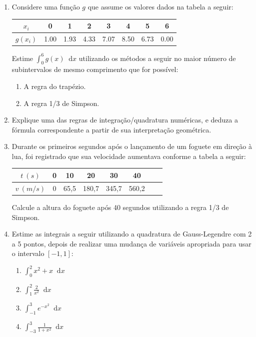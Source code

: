 \documentclass[12pt,a4paper]{article}
\newcommand*\diff{\mathop{}\!\mathrm{d}}
\begin{document}
\begin{enumerate}
\item Considere uma função $g$ que assume os valores dados na tabela a seguir:
\begin{center}
\begin{tabular}{|c|c|c|c|c|c|c|c|}
\hline
   $x_i$ & 0 & 1 & 2 & 3 & 4 & 5 & 6 \\ \hline
$g(x_i)$ & 1.00 & 1.93 & 4.33 & 7.07 & 8.50 & 6.73 & 0.00 \\
\hline
\end{tabular}
\end{center}
Estime $\int_0^6 g(x)\diff{x}$ utilizando os métodos a seguir no maior número de subintervalos de mesmo comprimento que for possível:
\begin{multicols}{2}
\begin{enumerate}
\item A regra do trapézio.
\item A regra 1/3 de Simpson.
\end{enumerate}
\end{multicols}

\item Explique uma das regras de integração/quadratura numéricas, e deduza a fórmula correspondente a partir de sua interpretação geométrica.

\item Durante os primeiros segundos após o lançamento de um foguete em direção à lua, foi registrado que sua velocidade aumentava conforme a tabela a seguir:
\begin{center}
\begin{tabular}{|c|c|c|c|c|c|c|c|}
\hline
  $t\ (s)$ & 0 & 10 & 20 & 30 & 40 \\ \hline
$v\ (m/s)$ & 0 & 65,5 & 180,7 & 345,7 & 560,2 \\
\hline
\end{tabular}
\end{center}
Calcule a altura do foguete após 40 segundos utilizando a regra 1/3 de Simpson.

\item Estime as integrais a seguir utilizando a quadratura de Gauss-Legendre com 2 a 5 pontos, depois de realizar uma mudança de variáveis apropriada para usar o intervalo $[-1,1]$:
\begin{multicols}{4}
\begin{enumerate}
\item $\int_0^2 x^2 + x\diff{x}$
\item $\int_1^2 \frac{2}{x^2}\diff{x}$
\item $\int_{-1}^3 e^{-x^2}\diff{x}$
\item $\int_{-3}^3 \frac{1}{1+x^2} \diff{x}$
\end{enumerate}
\end{multicols}


\end{enumerate}
\end{document}

